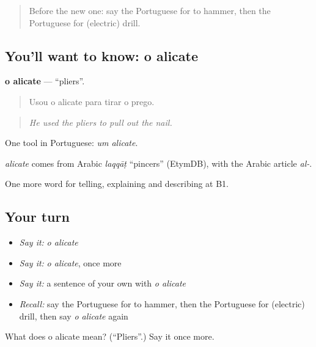 \label{lesson:PT-C531-alicate}



\begin{quote}
Before the new one: say the Portuguese for to hammer, then the Portuguese for (electric) drill.
\end{quote}

\subsection*{You'll want to know: o alicate}
\textbf{o alicate} — \textquotedblleft{}pliers\textquotedblright{}.

\begin{quote}
Usou o alicate para tirar o prego.
\end{quote}

\begin{quote}
\emph{He used the pliers to pull out the nail.}
\end{quote}

One tool in Portuguese: \emph{um alicate}.

\begin{cousinweb}
\emph{alicate} comes from Arabic \emph{laqqāṭ} \textquotedblleft{}pincers\textquotedblright{} (EtymDB), with the Arabic article \emph{al-}.
\end{cousinweb}

\begin{grammarlens}[title={What you've built}]
One more word for telling, explaining and describing at B1.
\end{grammarlens}

\subsection*{Your turn}
\begin{itemize}
\raggedright
  \item \emph{Say it:} \emph{o alicate}
  \item \emph{Say it:} \emph{o alicate}, once more
  \item \emph{Say it:} a sentence of your own with \emph{o alicate}
  \item \emph{Recall:} say the Portuguese for to hammer, then the Portuguese for (electric) drill, then say \emph{o alicate} again
\end{itemize}

\begin{tcolorbox}[breakable,colback=teal!4,colframe=teal!35!black,title={Before you move on}]
What does o alicate mean? (\textquotedblleft{}Pliers\textquotedblright{}.) Say it once more.
\end{tcolorbox}
